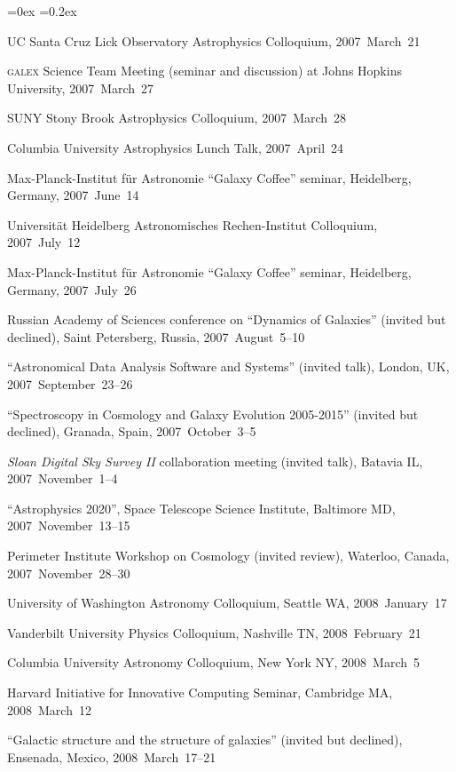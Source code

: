\documentclass[12pt,letterpaper]{article}
\newcommand{\project}[1]{\textsl{#1}}
\newcounter{refpubnum}
\newcommand{\hogglist}{%
    \rightmargin=0in
    \leftmargin=0.18in
    \topsep=0ex
    \partopsep=0pt
    \itemsep=0.2ex
    \parsep=0pt
    \itemindent=-1.0\leftmargin
    \listparindent=0.0\leftmargin
    \settowidth{\labelsep}{~}
    \usecounter{refpubnum}
  }
\begin{document}
\begin{list}{}{\hogglist}
{\item UC Santa Cruz Lick Observatory Astrophysics Colloquium, 2007~March~21
\item \textsc{galex} Science Team Meeting (seminar and discussion) at Johns Hopkins University, 2007~March~27
\item SUNY Stony Brook Astrophysics Colloquium, 2007~March~28
\item Columbia University Astrophysics Lunch Talk, 2007~April~24
\item Max-Planck-Institut f\"ur Astronomie ``Galaxy Coffee'' seminar, Heidelberg, Germany, 2007~June~14
\item Universit\"at Heidelberg Astronomisches Rechen-Institut Colloquium,
          2007~July~12
\item Max-Planck-Institut f\"ur Astronomie ``Galaxy Coffee'' seminar,
          Heidelberg, Germany,
          2007~July~26
\item Russian Academy of Sciences conference on ``Dynamics of Galaxies''
          (invited but declined), Saint Petersberg, Russia,
          2007~August~5--10
\item ``Astronomical Data Analysis Software and Systems'' (invited talk),
          London, UK, 2007~September~23--26
\item ``Spectroscopy in Cosmology and Galaxy Evolution 2005-2015''
          (invited but declined), Granada, Spain, 2007~October~3--5
\item \project{Sloan Digital Sky Survey II} collaboration meeting (invited talk),
          Batavia IL, 2007~November~1--4
\item ``Astrophysics 2020'', Space Telescope Science Institute,
          Baltimore MD, 2007~November~13--15
\item Perimeter Institute Workshop on Cosmology (invited review),
          Waterloo, Canada, 2007~November~28--30
\item University of Washington Astronomy Colloquium,
          Seattle WA, 2008~January~17
\item Vanderbilt University Physics Colloquium,
          Nashville TN, 2008~February~21
\item Columbia University Astronomy Colloquium,
          New York NY, 2008~March~5
\item Harvard Initiative for Innovative Computing Seminar,
          Cambridge MA, 2008~March~12
\item ``Galactic structure and the structure of galaxies''
          (invited but declined), Ensenada, Mexico, 2008~March~17--21
}
\end{list}
\end{document}
